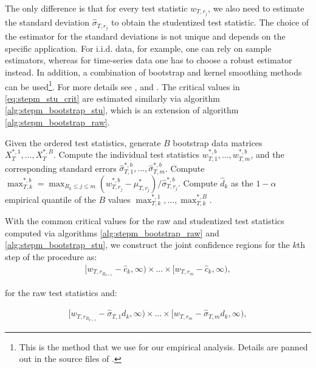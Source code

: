 \documentclass{article} %
\begin{document}
	The only difference is that for every test statistic $w_{T,r_j}$, we also need to estimate the standard deviation $\hat{\sigma}_{T,r_j}$ to obtain the studentized test statistic. The choice of the estimator for the standard deviations is not unique and depends on the specific application. For i.i.d. data, for example, one can rely on sample estimators, whereas for time-series data one has to choose a robust estimator instead. In addition, a combination of bootstrap and kernel smoothing methods can be used\footnote{This is the method that we use for our empirical analysis. Details are panned out in the source files of \textcite{SHEPPARCH}.}. For more details see \textcite{ROMANOWOLF2005}, \textcite{ANDREWS1991} and \textcite{ANDREWSMONAHAN1992}. The critical values in \eqref{eq:stepm_stu_crit} are estimated similarly via algorithm \ref{alg:stepm_bootstrap_stu}, which is an extension of algorithm \ref{alg:stepm_bootstrap_raw}.
	\begin{algorithm}
	\caption{Computation of the Studentized Critical Values for The StepM Procedure via The Bootstrap}
	\label{alg:stepm_bootstrap_stu}
		\begin{algorithmic}[1]
		\State Given the ordered test statistics, generate $B$ bootstrap data matrices $X_T^{*,1}, \dots , X_T^{*,B}$.
		\State Compute the individual test statistics $w_{T,1}^{*,b}, \dots, w_{T,m}^{*,b}$, and the corresponding standard errors $\hat{\sigma}_{T,1}^{*,b}, \dots, \hat{\sigma}_{T,m}^{*,b}$.
		\EndFor
		\State Compute $\max_{T,k}^{*,b} = \max_{R_k \leq j \leq m} (w_{T,r_j}^{*,b} - \mu_{T,r_j}^*)/\hat{\sigma}_{T,r_j}^{*,b}$.
		\EndFor
		\State Compute $\hat{d}_k$ as the $1 - \alpha$ empirical quantile of the $B$ values $\max_{T,k}^{*,1}, \dots, \max_{T,k}^{*,B}$.
		\end{algorithmic}
	\end{algorithm}

	With the common critical values for the raw and studentized test statistics computed via algorithms \ref{alg:stepm_bootstrap_raw} and \ref{alg:stepm_bootstrap_stu}, we construct the joint confidence regions for the $k$th step of the procedure as:
	\begin{align}
		[w_{T,r_{R_{k+1}}}-\hat{c}_k,\infty)
		\times
		\dots
		\times
		[w_{T,r_m}-\hat{c}_k,\infty),
	\end{align}
	
	for the raw test statistics and:
	
	\begin{align}
		[w_{T,r_{R_{k+1}}}-\hat{\sigma}_{T,1} d_k,\infty)
		\times
		\dots
		\times
		[w_{T,r_m}-\hat{\sigma}_{T,m} d_k ,\infty),
	\end{align}
	
\end{document}

